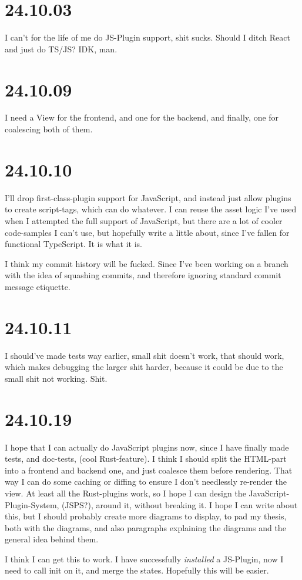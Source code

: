 \section{24.10.03}

I can't for the life of me do JS-Plugin support, shit sucks.
Should I ditch React and just do TS/JS? IDK, man.


\section{24.10.09}

I need a View for the frontend, and one for the backend, and finally, one for
coalescing both of them.


\section{24.10.10}

I'll drop first-class-plugin support for JavaScript, and instead just allow
plugins to create script-tags, which can do whatever. I can reuse the asset
logic I've used when I attempted the full support of JavaScript, but there are
a lot of cooler code-samples I can't use, but hopefully write a little about,
since I've fallen for functional TypeScript. It is what it is.

I think my commit history will be fucked. Since I've been working on a branch
with the idea of squashing commits, and therefore ignoring standard commit
message etiquette.


\section{24.10.11}

I should've made tests way earlier, small shit doesn't work, that should work,
which makes debugging the larger shit harder, because it could be due to the
small shit not working. Shit.


\section{24.10.19}

I hope that I can actually do JavaScript plugins now, since I have finally made
tests, and doc-tests, (cool Rust-feature). I think I should split the HTML-part
into a frontend and backend one, and just coalesce them before rendering. That
way I can do some caching or diffing to ensure I don't needlessly re-render the
view.
At least all the Rust-plugins work, so I hope I can design the
JavaScript-Plugin-System, (JSPS?), around it, without breaking it. I hope I can
write about this, but I should probably create more diagrams to display, to pad
my thesis, both with the diagrams, and also paragraphs explaining the diagrams
and the general idea behind them.

I think I can get this to work. I have successfully \textit{installed} a
JS-Plugin, now I need to call init on it, and merge the states. Hopefully this
will be easier.
